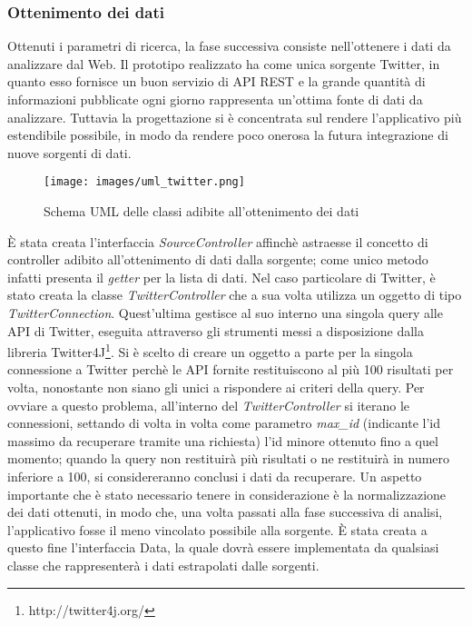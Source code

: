 \subsubsection{Ottenimento dei dati}
Ottenuti i parametri di ricerca, la fase successiva consiste nell'ottenere i dati da analizzare dal Web. Il prototipo realizzato ha come unica sorgente Twitter, in quanto esso fornisce un buon servizio di API REST e la grande quantità di informazioni pubblicate ogni giorno rappresenta un'ottima fonte di dati da analizzare. Tuttavia la progettazione si è concentrata sul rendere l'applicativo più estendibile possibile, in modo da rendere poco onerosa la futura integrazione di nuove sorgenti di dati. 

\begin{figure}[h]
    \centering
    \texttt{[image: images/uml\_twitter.png]}
    \caption{Schema UML delle classi adibite all'ottenimento dei dati}
    \label{fig:uml_twitter}
\end{figure}

È stata creata l'interfaccia \textit{SourceController} affinchè astraesse il concetto di controller adibito all'ottenimento di dati dalla sorgente; come unico metodo infatti presenta il \textit{getter} per la lista di dati. \newline
Nel caso particolare di Twitter, è stato creata la classe \textit{TwitterController} che a sua volta utilizza un oggetto di tipo \textit{TwitterConnection}. Quest'ultima gestisce al suo interno una singola query alle API di Twitter, eseguita attraverso gli strumenti messi a disposizione dalla libreria Twitter4J\footnote{http://twitter4j.org/}. Si è scelto di creare un oggetto a parte per la singola connessione a Twitter perchè le API fornite restituiscono al più 100 risultati per volta, nonostante non siano gli unici a rispondere ai criteri della query. Per ovviare a questo problema, all'interno del \textit{TwitterController} si iterano le connessioni, settando di volta in volta come parametro \textit{max\_id} (indicante l'id massimo da recuperare tramite una richiesta) l'id minore ottenuto fino a quel momento; quando la query non restituirà più risultati o ne restituirà in numero inferiore a 100, si considereranno conclusi i dati da recuperare. \newline
Un aspetto importante che è stato necessario tenere in considerazione è la normalizzazione dei dati ottenuti, in modo che, una volta passati alla fase successiva di analisi, l'applicativo fosse il meno vincolato possibile alla sorgente. È stata creata a questo fine l'interfaccia Data, la quale dovrà essere implementata da qualsiasi classe che rappresenterà i dati estrapolati dalle sorgenti.

